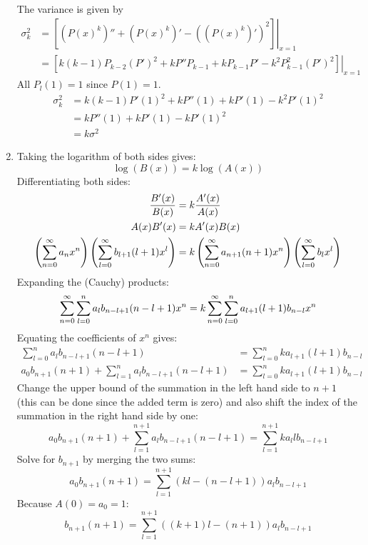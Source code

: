 \begin{solution}
\begin{enumerate}[label=(\alph*)]
        The variance is given by
        \begin{align*}
            \sigma_k^2 &= \left.\left[(P(x)^k)'' + (P(x)^k)' - \left((P(x)^k)'\right)^2\right]\right\rvert_{x=1} \\
            &= \left.\left[k(k-1)P_{k-2}(P')^2 + kP''P_{k-1} + kP_{k-1}P' - k^2P_{k-1}^2 (P')^2\right]\right\rvert_{x=1}
        \end{align*}
        All $P_{l}(1) = 1$ since $P(1)=1$.
        \begin{align*}
            \sigma^2_k &= k(k-1)P'(1)^2 + kP''(1) + kP'(1) - k^2P'(1)^2 \\
            &= kP''(1) + k P'(1) - k P'(1)^2 \\
            &= k\sigma^2
        \end{align*}
        \item Taking the logarithm of both sides gives:
        \[
            \log(B(x)) = k \log(A(x))
        \]
        Differentiating both sides:
        \begin{align*}
            \frac{B'(x)}{B(x)} &= k \frac{A'(x)}{A(x)} \\
            A(x)B'(x) &= kA'(x)B(x) \\
            \left(\bsum a_nx^n\right)\left(\bsum[l]b_{l+1}(l+1)x^l\right) &= k\left(\bsum[n] a_{n+1}(n+1)x^n\right) \left(\bsum[l]b_lx^l\right)
        \end{align*}
        Expanding the (Cauchy) products:
        \[
            \bsum \sum_{l=0}^n a_l b_{n-l+1}(n-l+1) x^n = k\bsum \sum_{l=0}^n a_{l+1}(l+1)b_{n-l} x^n
        \]
        Equating the coefficients of $x^n$ gives:
        \begin{align*}
            \sum_{l=0}^n a_l b_{n-l+1}(n-l+1) &= \sum_{l=0}^n ka_{l+1}(l+1)b_{n-l} \\
            a_0b_{n+1}(n+1) + \sum_{l=1}^n a_lb_{n-l+1}(n-l+1) &= \sum_{l=0}^n ka_{l+1}(l+1)b_{n-l}
        \end{align*}
        Change the upper bound of the summation in the left hand side to $n+1$ (this can be done since the added term is zero) and also shift the index of the summation in the right hand side by one:
        \[
            a_0b_{n+1}(n+1) + \sum_{l=1}^{n+1} a_{l} b_{n-l+1}(n-l+1) = \sum_{l=1}^{n+1} ka_l l b_{n-l+1} 
        \]
        Solve for $b_{n+1}$ by merging the two sums:
        \[
            a_0b_{n+1}(n+1) = \sum_{l=1}^{n+1} (kl - (n-l+1))a_lb_{n-l+1}
        \]
        Because $A(0) = a_0 = 1$:
        \[
            b_{n+1}(n+1) = \sum_{l=1}^{n+1} ((k+1)l - (n+1))a_lb_{n-l+1}
\]
\end{enumerate}
\end{solution}
